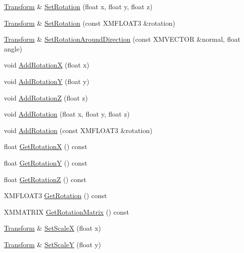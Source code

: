\begin{DoxyCompactItemize}
\item 
\hyperlink{structmage_1_1_transform}{Transform} \& \hyperlink{structmage_1_1_transform_a46e9e3f5eb3b205307722af7b4a3e85e}{Set\+Rotation} (float x, float y, float z)
\item 
\hyperlink{structmage_1_1_transform}{Transform} \& \hyperlink{structmage_1_1_transform_a53c42baf34a4b36ba5854e464ffcda04}{Set\+Rotation} (const X\+M\+F\+L\+O\+A\+T3 \&rotation)
\item 
\hyperlink{structmage_1_1_transform}{Transform} \& \hyperlink{structmage_1_1_transform_a92793c48ad6eaae813daa5ba7a1f8c94}{Set\+Rotation\+Around\+Direction} (const X\+M\+V\+E\+C\+T\+OR \&normal, float angle)
\item 
void \hyperlink{structmage_1_1_transform_ae2a3a4a33ec637b9c39e97519bab5a11}{Add\+RotationX} (float x)
\item 
void \hyperlink{structmage_1_1_transform_afc958d2361a5606962b51646825287e2}{Add\+RotationY} (float y)
\item 
void \hyperlink{structmage_1_1_transform_ae70e192a7d98366b629c3d75a7d2d3bd}{Add\+RotationZ} (float z)
\item 
void \hyperlink{structmage_1_1_transform_a71126843acf10e00d0381b5463978aba}{Add\+Rotation} (float x, float y, float z)
\item 
void \hyperlink{structmage_1_1_transform_a10825624e694790a60e0ea507207132e}{Add\+Rotation} (const X\+M\+F\+L\+O\+A\+T3 \&rotation)
\item 
float \hyperlink{structmage_1_1_transform_aaaf300a4a24b976c271ba17c8a41beaf}{Get\+RotationX} () const
\item 
float \hyperlink{structmage_1_1_transform_a93ccd53bd0a4e71ab7f42447d482ab86}{Get\+RotationY} () const
\item 
float \hyperlink{structmage_1_1_transform_ae1dd099e12e6dedadbc31d679343b39a}{Get\+RotationZ} () const
\item 
X\+M\+F\+L\+O\+A\+T3 \hyperlink{structmage_1_1_transform_a30a0464b1bd2fb37d6b5cc2155323a14}{Get\+Rotation} () const
\item 
X\+M\+M\+A\+T\+R\+IX \hyperlink{structmage_1_1_transform_a27ca7a5c40ea16c9a885a410b2a1f416}{Get\+Rotation\+Matrix} () const
\item 
\hyperlink{structmage_1_1_transform}{Transform} \& \hyperlink{structmage_1_1_transform_a87472bb592801d9acc02ff9a0f1b8240}{Set\+ScaleX} (float x)
\item 
\hyperlink{structmage_1_1_transform}{Transform} \& \hyperlink{structmage_1_1_transform_adfd62325eddaf2e5f349f4c785564a37}{Set\+ScaleY} (float y)

\end{DoxyCompactItemize}
